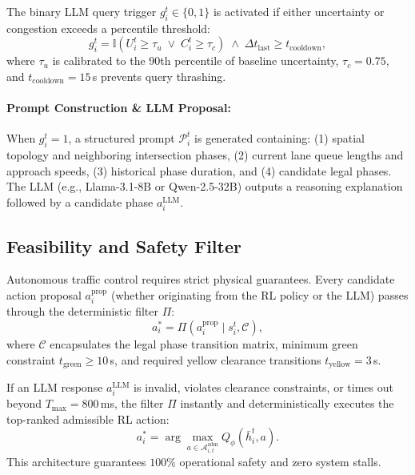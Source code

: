 \documentclass[11pt,a4paper,twocolumn]{article}
\begin{document}
The binary LLM query trigger $g_i^t \in \{0, 1\}$ is activated if either uncertainty or congestion exceeds a percentile threshold:
\begin{equation}
    g_i^t = \mathbb{I}\left( U_i^t \geq \tau_u \;\lor\; C_i^t \geq \tau_c \right) \;\land\; \Delta t_{\text{last}} \geq t_{\text{cooldown}},
\end{equation}
where $\tau_u$ is calibrated to the 90th percentile of baseline uncertainty, $\tau_c = 0.75$, and $t_{\text{cooldown}} = 15$\,s prevents query thrashing.

\paragraph{Prompt Construction \& LLM Proposal:}
When $g_i^t = 1$, a structured prompt $\mathcal{P}_i^t$ is generated containing: (1) spatial topology and neighboring intersection phases, (2) current lane queue lengths and approach speeds, (3) historical phase duration, and (4) candidate legal phases. The LLM (e.g., Llama-3.1-8B or Qwen-2.5-32B) outputs a reasoning explanation followed by a candidate phase $a_i^{\text{LLM}}$.

\subsection{Feasibility and Safety Filter}
Autonomous traffic control requires strict physical guarantees. Every candidate action proposal $a_i^{\text{prop}}$ (whether originating from the RL policy or the LLM) passes through the deterministic filter $\Pi$:
\begin{equation}
    a_i^* = \Pi(a_i^{\text{prop}} \mid s_i^t, \mathcal{C}),
\end{equation}
where $\mathcal{C}$ encapsulates the legal phase transition matrix, minimum green constraint $t_{\text{green}} \geq 10$\,s, and required yellow clearance transitions $t_{\text{yellow}} = 3$\,s. 

If an LLM response $a_i^{\text{LLM}}$ is invalid, violates clearance constraints, or times out beyond $T_{\text{max}} = 800$\,ms, the filter $\Pi$ instantly and deterministically executes the top-ranked admissible RL action:
\begin{equation}
    a_i^* = \arg\max_{a \in \mathcal{A}_{i,t}^{\text{adm}}} Q_\phi(\bar{h}_i^t, a).
\end{equation}
This architecture guarantees $100\%$ operational safety and zero system stalls.
\end{document}

